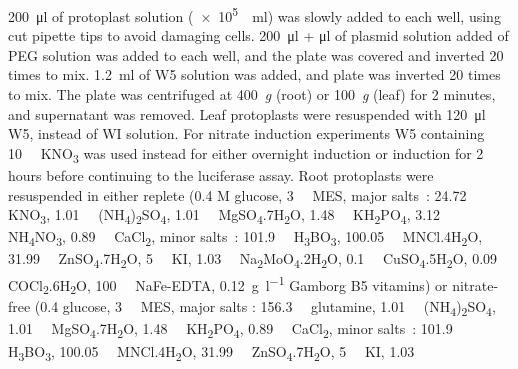 \SI{200}{\micro\litre} of protoplast solution (\SI{e5}{\per\ml}) was slowly added to each well, using cut pipette tips to avoid damaging cells. \SI{200}{\micro\litre} + \si{\micro\litre} of plasmid solution added of PEG solution was added to each well, and the plate was covered and inverted 20 times to mix. \SI{1.2}{\ml} of W5 solution was added, and plate was inverted 20 times to mix. The plate was centrifuged at 400~\textit{g} (root) or 100~\textit{g} (leaf) for 2 minutes, and supernatant was removed. Leaf protoplasts were resuspended with \SI{120}{\micro\litre} W5, instead of WI solution. For nitrate induction experiments W5 containing \SI{10}{\milli\Molar} KNO\textsubscript{3} was used instead for either overnight induction or induction for 2 hours before continuing to the luciferase assay. Root protoplasts were resuspended in either replete (0.4 M glucose, \SI{3}{\milli\Molar} MES, major salts~\autocite{nagyCallusInductionPlant1976}: \SI{24.72}{\milli\Molar} KNO\textsubscript{3}, \SI{1.01}{\milli\Molar} (NH\textsubscript{4})\textsubscript{2}SO\textsubscript{4}, \SI{1.01}{\milli\Molar}
MgSO\textsubscript{4}.7H\textsubscript{2}O, \SI{1.48}{\milli\Molar}
KH\textsubscript{2}PO\textsubscript{4}, \SI{3.12}{\milli\Molar}
NH\textsubscript{4}NO\textsubscript{3}, \SI{0.89}{\milli\Molar} CaCl\textsubscript{2},
minor salts~\autocite{gamborgNutrientRequirementsSuspension1968}: \SI{101.9}{\micro\Molar}
H\textsubscript{3}BO\textsubscript{3}, \SI{100.05}{\micro\Molar}
MNCl.4H\textsubscript{2}O, \SI{31.99}{\micro\Molar} 
ZnSO\textsubscript{4}.7H\textsubscript{2}O, \SI{5}{\micro\Molar} KI, \SI{1.03}{\micro\Molar} 
Na\textsubscript{2}MoO\textsubscript{4}.2H\textsubscript{2}O, \SI{0.1}{\micro\Molar}
CuSO\textsubscript{4}.5H\textsubscript{2}O, \SI{0.09}{\micro\Molar}
COCl\textsubscript{2}.6H\textsubscript{2}O, \SI{100}{\micro\Molar}  NaFe\hyp{}EDTA, \SI{0.12}{\gram\per\l} Gamborg B5 vitamins) or nitrate\hyp{}free (\SI{0.4}{\Molar} glucose, \SI{3}{\milli\Molar} MES, major salts \autocite{nagyCallusInductionPlant1976}: \SI{156.3}{\milli\Molar} glutamine,
\SI{1.01}{\milli\Molar} (NH\textsubscript{4})\textsubscript{2}SO\textsubscript{4}, \SI{1.01}{\milli\Molar} MgSO\textsubscript{4}.7H\textsubscript{2}O, \SI{1.48}{\milli\Molar}
KH\textsubscript{2}PO\textsubscript{4}, \SI{0.89}{\milli\Molar} CaCl\textsubscript{2},
minor salts~\autocite{gamborgNutrientRequirementsSuspension1968}: \SI{101.9}{\micro\Molar}
H\textsubscript{3}BO\textsubscript{3}, \SI{100.05}{\micro\Molar}
MNCl.4H\textsubscript{2}O, \SI{31.99}{\micro\Molar} 
ZnSO\textsubscript{4}.7H\textsubscript{2}O, \SI{5}{\micro\Molar} KI, \SI{1.03}{\micro\Molar} 
